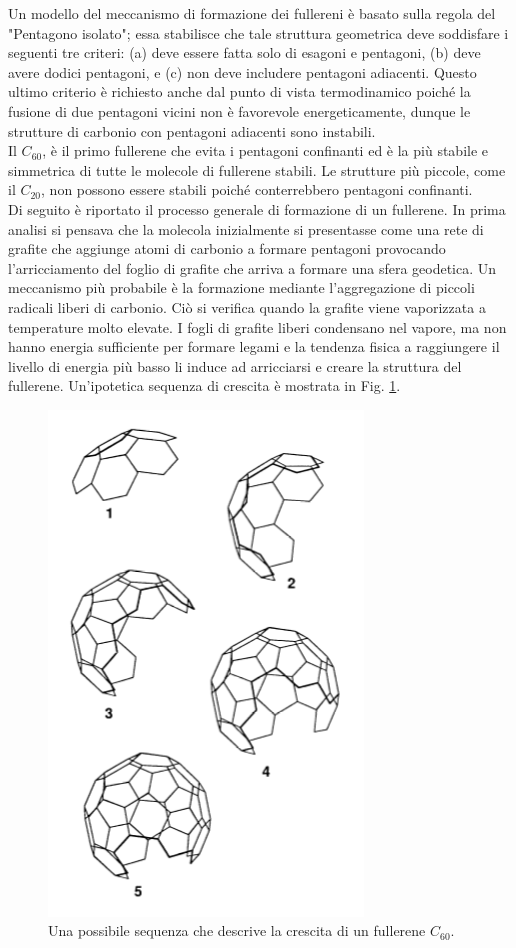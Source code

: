 \documentclass[a4paper,titlepage]{book}
\begin{document}
Un modello del meccanismo di formazione dei fullereni è basato sulla regola del "Pentagono isolato"; essa stabilisce che tale struttura geometrica deve soddisfare i seguenti tre criteri: (a) deve essere fatta solo di esagoni e pentagoni, (b) deve avere dodici pentagoni, e (c) non deve includere pentagoni adiacenti. Questo ultimo criterio è richiesto anche dal punto di vista termodinamico poiché la fusione di due pentagoni vicini non è favorevole energeticamente, dunque le strutture di carbonio con pentagoni adiacenti sono instabili. \\
Il $C_{60}$, è il primo fullerene che evita i pentagoni confinanti ed è la più stabile e simmetrica di tutte le molecole di fullerene stabili. Le strutture più piccole, come il $C_{20}$, non possono essere stabili poiché conterrebbero pentagoni confinanti. \\
Di seguito è riportato il processo generale di formazione di un fullerene. In prima analisi si pensava che la molecola inizialmente si presentasse come una rete di grafite che aggiunge atomi di carbonio a formare pentagoni provocando l'arricciamento del foglio di grafite che arriva a formare una sfera geodetica. Un meccanismo più probabile è la formazione mediante l'aggregazione di piccoli radicali liberi di carbonio. Ciò si verifica quando la grafite viene vaporizzata a temperature molto elevate. I fogli di grafite liberi condensano nel vapore, ma non hanno energia sufficiente per formare legami e la tendenza fisica a raggiungere il livello di energia più basso li induce ad arricciarsi e creare la struttura del fullerene. Un'ipotetica sequenza di crescita è mostrata in Fig. \ref{gro}. \\
\begin{figure}[h!] 
	\centering
	\includegraphics[width=0.35\columnwidth]{growth.png}
	\caption{ 	\label{gro}
		Una possibile sequenza che descrive la crescita di un fullerene $C_{60}$.
	}
\end{figure}
\end{document}
